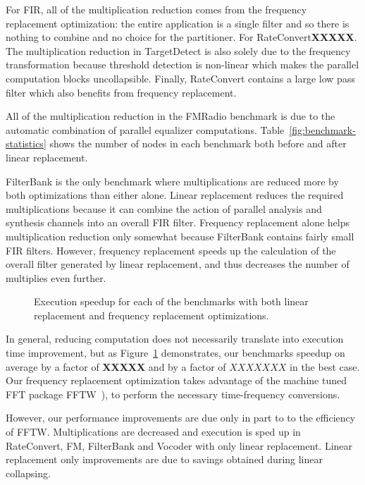 For FIR, all of the multiplication reduction comes from the
frequency replacement optimization: the entire application is
a single filter and so there is nothing to combine and no choice
for the partitioner.
For RateConvert{\bf XXXXX}.
The multiplication reduction in TargetDetect is
also solely due to the frequency transformation because threshold
detection is non-linear which makes the parallel computation blocks
uncollapsible. Finally, RateConvert contains a large low pass filter
which also benefits from frequency replacement.

All of the multiplication reduction in the FMRadio benchmark is due to
the automatic combination of parallel equalizer computations.
Table~\ref{fig:benchmark-statistics} shows the number of nodes in each
benchmark both before and after linear replacement.

FilterBank is the only benchmark where multiplications are reduced  
more by both optimizations than either alone. Linear replacement reduces
the required multiplications because it can combine the action of parallel analysis 
and synthesis channels into an overall FIR filter. Frequency replacement alone helps 
multiplication reduction only somewhat because FilterBank contains fairly small FIR filters.
However, frequency replacement speeds up the calculation of the overall filter
generated by linear replacement, and thus decreases the number of multiplies even further.

\begin{figure}[t]
\center
\epsfxsize=3.2in
\vspace{-6pt}
\caption{Execution speedup for each of the benchmarks with both linear replacement and frequency replacement optimizations.}
\label{fig:execution-speedup}
\vspace{-6pt}
\end{figure}

In general, reducing computation does not necessarily translate into 
execution time improvement, but as Figure~\ref{fig:execution-speedup} 
demonstrates, our benchmarks speedup on average by a factor of {\bf XXXXX} 
and by a factor of $XXXXXXX$ in the best case. Our frequency replacement optimization
takes advantage of the machine tuned FFT package FFTW~\cite{frigo99fast}), 
to perform the necessary time-frequency conversions.

However, our performance improvements are due only in part to to the efficiency of FFTW. 
Multiplications are decreased and execution is sped up in RateConvert, FM, FilterBank and
Vocoder with only linear replacement. Linear replacement only improvements are
due to savings obtained during linear collapsing.

